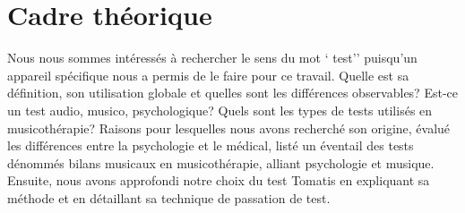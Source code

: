 \chapter{Cadre théorique}





Nous nous sommes intéressés à rechercher le sens du mot  ` test'' puisqu'un appareil spécifique nous a 
permis de le faire pour ce travail. Quelle est sa définition, son utilisation globale et quelles sont les 
différences observables?
Est-ce un test audio, musico, psychologique?
Quels sont les types de tests utilisés en musicothérapie?
Raisons pour lesquelles nous avons recherché son origine, évalué les différences entre la psychologie et 
le médical, listé un éventail des tests dénommés bilans musicaux en musicothérapie, alliant psychologie 
et musique. Ensuite,  nous avons approfondi notre choix du test Tomatis en expliquant sa méthode et en 
détaillant sa technique de passation de test.


